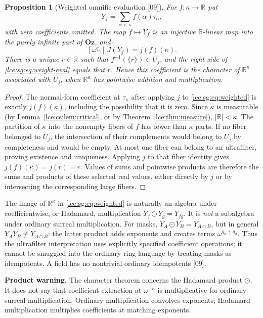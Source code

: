 \documentclass[11pt,letterpaper]{article}
\numberwithin{equation}{section}
\newtheorem{proposition}[theorem]{Proposition}
\theoremstyle{definition}
\theoremstyle{remark}
\newcommand{\Oz}{\mathbf{Oz}}
\newcommand{\R}{\mathbb R}
\newcommand{\coef}[2]{[\omega^{#1}]\,#2}
\newcommand{\abs}[1]{\lvert#1\rvert}
\newcommand{\status}[1]{\begin{tcolorbox}[colback=pale,colframe=ink,boxrule=.45pt,arc=0pt,left=9pt,right=9pt,top=7pt,bottom=7pt]#1\end{tcolorbox}}
\newcommand{\thref}[1]{Theorem~\ref{#1}}
\newcommand{\leref}[1]{Lemma~\ref{#1}}
\newcommand{\src}[1]{\textup{\textsf{\small[#1]}}}%
\begin{document}
\begin{proposition}[Weighted omnific evaluation \src{09}]\label{lce:sg:prop:weighted}
For $f:\kappa\to\R$ put
\begin{equation}\label{lce:sg:eq:weighted}
 Y_f=\sum_{\alpha<\kappa}f(\alpha)\tau_\alpha,
\end{equation}
with zero coefficients omitted. The map $f\mapsto Y_f$ is an injective
$\R$-linear map into the purely infinite part of $\Oz$, and
\begin{equation}\label{lce:sg:eq:weight-eval}
 \coef{q_\kappa}{J(Y_f)}=j(f)(\kappa).
\end{equation}
There is a unique $r\in\R$ such that $f^{-1}(\{r\})\in U_j$, and the right
side of \eqref{lce:sg:eq:weight-eval} equals that $r$. Hence this
coefficient is the character of $\R^\kappa$ associated with $U_j$, when
$\R^\kappa$ has pointwise addition and multiplication.
\end{proposition}
\begin{proof}
The normal-form coefficient at $\tau_\kappa$ after applying $j$ to
\eqref{lce:sg:eq:weighted} is exactly $j(f)(\kappa)$, including the
possibility that it is zero. Since $\kappa$ is measurable (by
\leref{lce:cs:lem:critical}, or by \thref{lce:thm:measure}), $\abs\R<\kappa$.
The partition of $\kappa$ into the nonempty fibers of $f$ has fewer than
$\kappa$ parts. If no fiber belonged to $U_j$, the intersection of their
complements would belong to $U_j$ by completeness and would be empty. At
most one fiber can belong to an ultrafilter, proving existence and
uniqueness. Applying $j$ to that fiber identity gives $j(f)(\kappa)=j(r)=r$.
Values of sums and pointwise products are therefore the sums and products
of these selected real values, either directly by $j$ or by intersecting
the corresponding large fibers.
\end{proof}
The image of $\R^\kappa$ in \eqref{lce:sg:eq:weighted} is naturally an
algebra under coefficientwise, or Hadamard, multiplication
$Y_f\odot Y_g=Y_{fg}$. It is \emph{not} a subalgebra under ordinary surreal
multiplication. For masks, $Y_A\odot Y_B=Y_{A\cap B}$, but in general
$Y_AY_B\ne Y_{A\cap B}$: the latter product adds exponents and creates terms
$\omega^{q_\alpha+q_\beta}$. Thus the ultrafilter interpretation uses
explicitly specified coefficient operations; it cannot be smuggled into the
ordinary ring language by treating masks as idempotents. A field has no
nontrivial ordinary idempotents \src{09}.

\status{\textbf{Product warning.} The character theorem concerns the Hadamard
product $\odot$. It does not say that coefficient extraction at
$\omega^{-\kappa}$ is multiplicative for ordinary surreal multiplication.
Ordinary multiplication convolves exponents; Hadamard multiplication
multiplies coefficients at matching exponents.}
\end{document}
